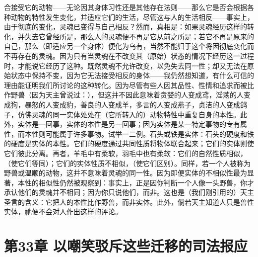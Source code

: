 合接受它的动物——无论因其身体习性还是其他存在法则——那么它是否会根据各种动物的特性发生变化，并适应它们的生活，尽管这与人的生活相反——事实上，由于彻底的变化，灵魂已变得与自己相反？然而，真相是：如果灵魂经历这样的转化，并失去它曾经所是，那么人的灵魂便不再是它从前之所是；若它不再是原来的自己，那么（即适应另一个身体）便化为乌有，当然不能归于这个将因彻底变化而不再存在的灵魂。因为只有当灵魂在不改变其（原始）状态的情况下经历这一过程时，才能说它经历了这种。既然灵魂不允许改变，以免失去同一性；却又无法在原始状态中保持不变，因为它无法接受相反的身体——我仍然想知道，有什么可信的理由能证明我们所讨论的这种转化。因为尽管有些人因其品性、性情和追求而被比作野兽（因为天主曾说过：），但这并不因此意味着贪婪的人变成鸢，淫荡的人变成狗，暴怒的人变成豹，善良的人变成羊，多言的人变成燕子，贞洁的人变成鸽子，仿佛灵魂的同一实体处处在（它所转入的）动物特性中重复自身的本性。此外，实体是一回事，实体的本性是另一回事；因为实体是某一特定事物的专有属性，而本性则可能属于许多事物。试举一二例。石头或铁是实体：石头的硬度和铁的硬度是实体的本性。它们的硬度通过共同性质将物体联合起来；它们的实体则使它们彼此分离。再者，羊毛中有柔软，羽毛中也有柔软：它们的自然性质相似，（使它们等同）；它们的实体性质不相似，（使它们区别）。同样，若一个人被称为野兽或温顺的动物，这并不意味着灵魂的同一性。因为即便实体的不相似性最为显著，本性的相似性仍然被观察到：事实上，正是因你判断一个人像一头野兽，你才承认他们的灵魂并不相同；因为你只说他们，而非。这也是（我们刚引用的）天主圣言的含义：它把人的本性比作野兽，而非实体。此外，倘若天主知道人只是兽性实体，祂便不会对人作出这样的评论。\par


\section{第33章 以嘲笑驳斥这些迁移的司法报应}

